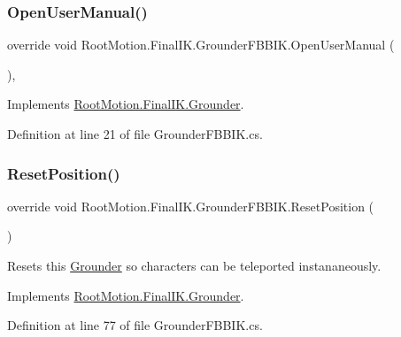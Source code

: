 \subsubsection{\texorpdfstring{Open\+User\+Manual()}{OpenUserManual()}}
{\footnotesize\ttfamily override void Root\+Motion.\+Final\+I\+K.\+Grounder\+F\+B\+B\+I\+K.\+Open\+User\+Manual (\begin{DoxyParamCaption}{ }\end{DoxyParamCaption})\hspace{0.3cm}{\ttfamily [protected]}, {\ttfamily [virtual]}}



Implements \mbox{\hyperlink{class_root_motion_1_1_final_i_k_1_1_grounder_af214d235ecea1b81ec637b1b61f756cb}{Root\+Motion.\+Final\+I\+K.\+Grounder}}.



Definition at line 21 of file Grounder\+F\+B\+B\+I\+K.\+cs.

\mbox{\label{class_root_motion_1_1_final_i_k_1_1_grounder_f_b_b_i_k_ad901ae9bce541cb70d2913643dda8e82}} 
\subsubsection{\texorpdfstring{Reset\+Position()}{ResetPosition()}}
{\footnotesize\ttfamily override void Root\+Motion.\+Final\+I\+K.\+Grounder\+F\+B\+B\+I\+K.\+Reset\+Position (\begin{DoxyParamCaption}{ }\end{DoxyParamCaption})\hspace{0.3cm}{\ttfamily [virtual]}}



Resets this \mbox{\hyperlink{class_root_motion_1_1_final_i_k_1_1_grounder}{Grounder}} so characters can be teleported instananeously. 



Implements \mbox{\hyperlink{class_root_motion_1_1_final_i_k_1_1_grounder_aecbd8b5addf2948f4d5fcd00a1b03314}{Root\+Motion.\+Final\+I\+K.\+Grounder}}.



Definition at line 77 of file Grounder\+F\+B\+B\+I\+K.\+cs.



